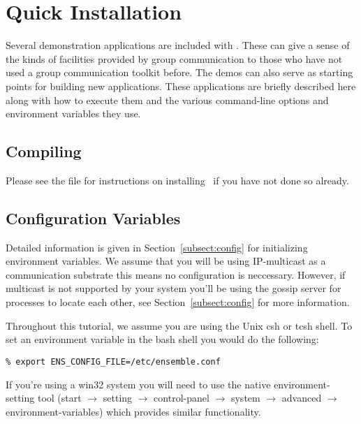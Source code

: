 %
%
%
\section{Quick Installation} 

Several demonstration applications are included with \ensemble.
These can give a sense of the kinds of facilities provided by group
communication to those who have not used a group communication
toolkit before.  The demos can also serve as starting points for
building new applications.  These applications are briefly described
here along with how to execute them and the various command-line
options and environment variables they use.

\subsection{Compiling}
Please see the file  for instructions on
installing \ensemble\ if you have not done so already.

\subsection{Configuration Variables}
Detailed information is given in Section~\ref{subsect:config} for
initializing environment variables. We assume that you will be using
IP-multicast as a communication substrate this means no configuration
is neccessary. However, if multicast is not supported by your system you'll
be using the gossip server for processes to locate each
other, see Section~\ref{subsect:config} for more information.

Throughout this tutorial, we assume you are using the Unix csh or
tcsh shell. To set an environment variable in the bash shell you would
do the following:
\begin{verbatim}
% export ENS_CONFIG_FILE=/etc/ensemble.conf
\end{verbatim}
If you're using a win32 system you will need to use the native
environment-setting tool
(start $\rightarrow$ setting $\rightarrow$ control-panel $\rightarrow$ system $\rightarrow$ advanced $\rightarrow$ environment-variables)
 which provides similar functionality. 

